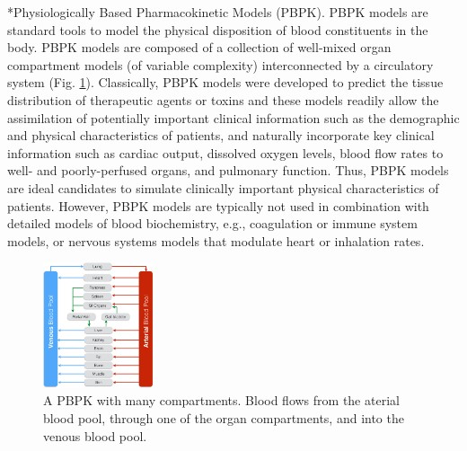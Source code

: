 \documentclass[11pt]{article}
\makeatletter
\renewcommand\subsection{\@startsection
	{subsection}{2}{0mm}
	{-0.05in}
	{-0.5\baselineskip}
	{\normalfont\normalsize\bfseries}}
\makeatother
\begin{document}
\subsection*{Physiologically Based Pharmacokinetic Models (PBPK).}
PBPK models are standard tools to model the physical disposition of blood constituents in the body.
PBPK models are composed of a collection of well-mixed organ compartment models (of variable complexity) interconnected by a circulatory system (Fig. \ref{fig:SamplePBPK}).
Classically, PBPK models were developed to predict the tissue distribution of therapeutic agents or toxins \cite{Gerlowski:1983aa} and these models readily allow the assimilation of potentially important clinical information such as the demographic and physical characteristics of patients,
and naturally incorporate key clinical information such as cardiac output,
dissolved oxygen levels, blood flow rates to well- and poorly-perfused organs, and pulmonary function.
Thus, PBPK models are ideal candidates to simulate clinically important physical characteristics of patients.
However, PBPK models are typically not used in combination with detailed models of blood biochemistry, e.g., coagulation or immune system models, or nervous systems models that modulate heart or inhalation rates.


\begin{figure}
  \includegraphics[width=0.29\textwidth]{./figs/PBPK-Figure-7-31-14.pdf}
  \caption{A PBPK with many compartments. Blood flows from the aterial blood pool, through one of the organ compartments, and into the venous blood pool.}\label{fig:SamplePBPK}
\end{figure}
\end{document}
